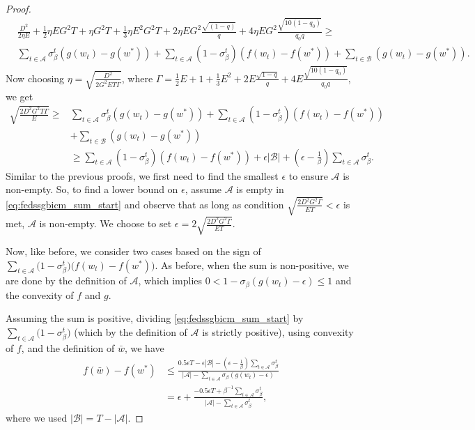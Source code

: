\documentclass{article} %
\def\A{{\mathcal A}}
\def\B{{\mathcal B}}
\begin{document}
\begin{proof}
\begin{equation*}
\begin{aligned}
       &\frac{D^2}{2\eta E} + \frac{1}{2}\eta E G^2 T + \eta G^2 T + \frac{1}{3}\eta E^2 G^2 T + 2\eta E G^2\frac{\sqrt{(1-q)}}{q} + 4\eta E G^2 \frac{\sqrt{10(1-q_0)}}{q_0q} \geq 
       \\
       &
       \sum_{t\in \A} \sigma_\beta^t \left(g(w_t) - g(w^*) \right) 
       + \sum_{t\in \A} (1 - \sigma_{\beta}^t)\left(f(w_t) - f(w^*)  \right)+\sum_{t\in \B} \left(g(w_t) - g(w^*) \right). 
    \end{aligned}
\end{equation*}
Now choosing $\eta = \sqrt{\frac{D^2}{2G^2 E T \Gamma}}$, where $\Gamma = \frac{1}{2} E + 1 + \frac{1}{3} E^2 + 2E\frac{\sqrt{1-q}}{q} + 4E\frac{\sqrt{10(1-q_0)}}{q_0q}$, we get
\begin{equation}
    \label{eq:fedssgbicm_sum_start}
    \begin{aligned}
      \sqrt{\frac{{2 D^2 G^2 T \Gamma}}{{E}}} \geq &\sum_{t\in \A} \sigma_\beta^t \left(g(w_t) - g(w^*) \right) 
       + \sum_{t\in \A} (1 - \sigma_{\beta}^t)\left(f(w_t) - f(w^*)  \right) 
       \\
       &+\sum_{t\in \B} \left(g(w_t) - g(w^*) \right)
       \\
       &\geq \sum_{t\in \A} (1 - \sigma_{\beta}^t)\left(f(w_t) - f(w^*)  \right) + \epsilon|\B| + \left(\epsilon - \frac{1}{\beta}\right)\sum_{t\in \A} \sigma_\beta^t.
    \end{aligned}
\end{equation}
Similar to the previous proofs, we first need to find the smallest $\epsilon$ to ensure $\A$ is non-empty. So, to find a lower bound on $\epsilon$, assume $\A$ is empty in \cref{eq:fedssgbicm_sum_start} and observe that as long as condition $\sqrt{\frac{{2 D^2 G^2\Gamma}}{{E T}}} < \epsilon$ is met, $\A$ is non-empty. We choose to set $\epsilon = 2\sqrt{\frac{{2 D^2 G^2\Gamma}}{{E T}}}$.

Now, like before, we consider two cases based on the sign of $\sum_{t\in \A} \big(1-\sigma_\beta^t\big) \big(f(w_t)-f(w^*)\big)$. As before, when the sum is non-positive, we are done by the definition of $\A$, which implies $0<1-\sigma_\beta(g(w_t)-\epsilon)\leq 1$ and the convexity of $f$ and $g$. 

Assuming the sum is positive, dividing  \cref{eq:fedssgbicm_sum_start} by $\sum_{t\in \A} \big(1-\sigma_\beta^t\big)$ (which by the definition of $\A$ is strictly positive), using convexity of $f$, and the definition of $\bar{w}$, we have
\begin{equation*}
\begin{aligned}
       f(\bar{w})-f(w^*) &\leq  \frac{0.5\epsilon T - \epsilon |\B|-(\epsilon-\frac{1}{\beta})\sum_{t\in \A} \sigma_\beta^t}{|\A| - \sum_{t\in \A} \sigma_\beta(g(w_t)-\epsilon)}\\&=\epsilon+\frac{-0.5\epsilon T+\beta^{-1}\sum_{t\in \A} \sigma_\beta^t}{|\A| - \sum_{t\in \A} \sigma_\beta^t},
\end{aligned}
\end{equation*}
where we used $|\B| = T-|\A|$.


\end{proof}
\end{document}
